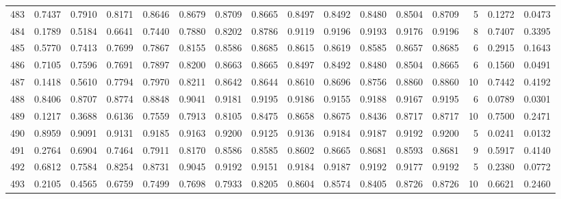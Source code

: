 \begin{tabular}{lrrrrrrrrrrrrrrr}
483 &      0.7437 &  0.7910 &  0.8171 &  0.8646 &  0.8679 &  0.8709 &  0.8665 &  0.8497 &  0.8492 &  0.8480 &   0.8504 &     0.8709 &      5 &                    0.1272 &                     0.0473 \\
484 &      0.1789 &  0.5184 &  0.6641 &  0.7440 &  0.7880 &  0.8202 &  0.8786 &  0.9119 &  0.9196 &  0.9193 &   0.9176 &     0.9196 &      8 &                    0.7407 &                     0.3395 \\
485 &      0.5770 &  0.7413 &  0.7699 &  0.7867 &  0.8155 &  0.8586 &  0.8685 &  0.8615 &  0.8619 &  0.8585 &   0.8657 &     0.8685 &      6 &                    0.2915 &                     0.1643 \\
486 &      0.7105 &  0.7596 &  0.7691 &  0.7897 &  0.8200 &  0.8663 &  0.8665 &  0.8497 &  0.8492 &  0.8480 &   0.8504 &     0.8665 &      6 &                    0.1560 &                     0.0491 \\
487 &      0.1418 &  0.5610 &  0.7794 &  0.7970 &  0.8211 &  0.8642 &  0.8644 &  0.8610 &  0.8696 &  0.8756 &   0.8860 &     0.8860 &     10 &                    0.7442 &                     0.4192 \\
488 &      0.8406 &  0.8707 &  0.8774 &  0.8848 &  0.9041 &  0.9181 &  0.9195 &  0.9186 &  0.9155 &  0.9188 &   0.9167 &     0.9195 &      6 &                    0.0789 &                     0.0301 \\
489 &      0.1217 &  0.3688 &  0.6136 &  0.7559 &  0.7913 &  0.8105 &  0.8475 &  0.8658 &  0.8675 &  0.8436 &   0.8717 &     0.8717 &     10 &                    0.7500 &                     0.2471 \\
490 &      0.8959 &  0.9091 &  0.9131 &  0.9185 &  0.9163 &  0.9200 &  0.9125 &  0.9136 &  0.9184 &  0.9187 &   0.9192 &     0.9200 &      5 &                    0.0241 &                     0.0132 \\
491 &      0.2764 &  0.6904 &  0.7464 &  0.7911 &  0.8170 &  0.8586 &  0.8585 &  0.8602 &  0.8665 &  0.8681 &   0.8593 &     0.8681 &      9 &                    0.5917 &                     0.4140 \\
492 &      0.6812 &  0.7584 &  0.8254 &  0.8731 &  0.9045 &  0.9192 &  0.9151 &  0.9184 &  0.9187 &  0.9192 &   0.9177 &     0.9192 &      5 &                    0.2380 &                     0.0772 \\
493 &      0.2105 &  0.4565 &  0.6759 &  0.7499 &  0.7698 &  0.7933 &  0.8205 &  0.8604 &  0.8574 &  0.8405 &   0.8726 &     0.8726 &     10 &                    0.6621 &                     0.2460 \\

\end{tabular}
